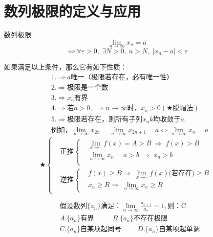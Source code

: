 \documentclass[cn,cyan,fleqn]{elegantbook}
\begin{document}
\section{数列极限的定义与应用}
\begin{definition}{数列极限}{}
\[\lim\limits_{n\to \infty}x_n=a\]
\[\Leftrightarrow \forall \varepsilon >0,\;\exists N>0,\;n>N,\;|x_n-a|<\varepsilon\]
\end{definition}
如果满足以上条件，那么它有如下性质：
\begin{equation*}
 \begin{aligned}
&1.\Rightarrow a \mbox{唯一（极限若存在，必有唯一性）}\\
&2.\Rightarrow \mbox{极限是一个数}\\
&3.\Rightarrow {x_n}\mbox{有界}\\
&4.\Rightarrow \mbox{若}a>0, \;\Rightarrow n\to\infty\mbox{时，}x_n>0(\bigstar\mbox{脱帽法})\\
&5.\Rightarrow\mbox{极限若存在，则所有子列}{x_nk}\mbox{均收敛于}a.\\
&\mbox{例如，}\lim\limits_{n\to \infty}x_{2n}=\lim\limits_{n\to \infty}x_{2n+1}=a\Leftrightarrow \lim\limits_{n\to\infty}x_n=a
\end{aligned}
\end{equation*}
\begin{equation*}
\bigstar\left\{\begin{aligned}
&\mbox{正推}\left\{\begin{aligned}
&\lim\limits_{x\to \cdot}f(x)=A>B\;\Rightarrow\; f(x)>B\\
&\lim\limits_{n\to \infty}x_n=a>b\;\Rightarrow\; x_n>b\\
\end{aligned}\right.\\
&\mbox{逆推}\left\{\begin{aligned}
&f(x)\geqslant B\Rightarrow\;\lim\limits_{x\to \cdot}f(x)\mbox{(若存在)}\geqslant B\\
&x_n\geqslant B\Rightarrow\;\lim\limits_{n\to \infty}x_n\geqslant B
\end{aligned}\right.
\end{aligned}\right.
\end{equation*}
\begin{problem}
\begin{equation*}
\begin{aligned}
&\mbox{假设数列}\{a_n\}\mbox{满足：}\lim\limits_{n\to \infty}\frac{a_{n+1}}{a_n}=1,\mbox{则：C}\\
&A.\{a_n\}\mbox{有界 }\hspace{1cm} B.\{a_n\}\mbox{不存在极限 }\\
&C.\{a_n\}\mbox{自某项起同号}\hspace{1cm} D.\{a_n\}\mbox{自某项起单调}
  \end{aligned}
\end{equation*}
\end{problem}
\end{document}
